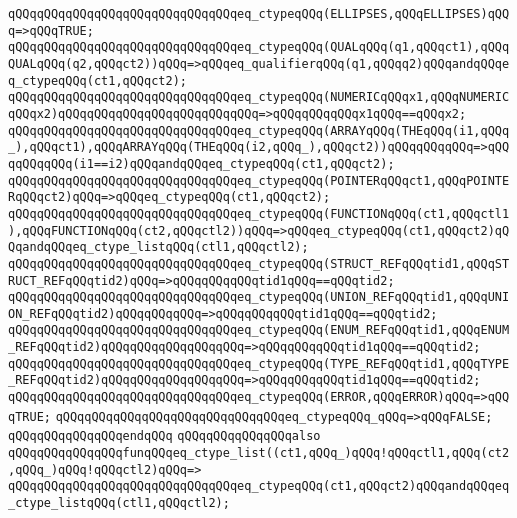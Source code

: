 \verb|qQQqqQQqqQQqqQQqqQQqqQQqqQQqqQQqeq_ctypeqQQq(ELLIPSES,qQQqELLIPSES)qQQq=>qQQqTRUE;|\newline
\verb|qQQqqQQqqQQqqQQqqQQqqQQqqQQqqQQqeq_ctypeqQQq(QUALqQQq(q1,qQQqct1),qQQqQUALqQQq(q2,qQQqct2))qQQq=>qQQqeq_qualifierqQQq(q1,qQQqq2)qQQqandqQQqeq_ctypeqQQq(ct1,qQQqct2);|\newline
\verb|qQQqqQQqqQQqqQQqqQQqqQQqqQQqqQQqeq_ctypeqQQq(NUMERICqQQqx1,qQQqNUMERICqQQqx2)qQQqqQQqqQQqqQQqqQQqqQQqqQQq=>qQQqqQQqqQQqx1qQQq==qQQqx2;|\newline
\verb|qQQqqQQqqQQqqQQqqQQqqQQqqQQqqQQqeq_ctypeqQQq(ARRAYqQQq(THEqQQq(i1,qQQq_),qQQqct1),qQQqARRAYqQQq(THEqQQq(i2,qQQq_),qQQqct2))qQQqqQQqqQQq=>qQQqqQQqqQQq(i1==i2)qQQqandqQQqeq_ctypeqQQq(ct1,qQQqct2);|\newline
\verb|qQQqqQQqqQQqqQQqqQQqqQQqqQQqqQQqeq_ctypeqQQq(POINTERqQQqct1,qQQqPOINTERqQQqct2)qQQq=>qQQqeq_ctypeqQQq(ct1,qQQqct2);|\newline
\verb|qQQqqQQqqQQqqQQqqQQqqQQqqQQqqQQqeq_ctypeqQQq(FUNCTIONqQQq(ct1,qQQqctl1),qQQqFUNCTIONqQQq(ct2,qQQqctl2))qQQq=>qQQqeq_ctypeqQQq(ct1,qQQqct2)qQQqandqQQqeq_ctype_listqQQq(ctl1,qQQqctl2);|\newline
\verb|qQQqqQQqqQQqqQQqqQQqqQQqqQQqqQQqeq_ctypeqQQq(STRUCT_REFqQQqtid1,qQQqSTRUCT_REFqQQqtid2)qQQq=>qQQqqQQqqQQqtid1qQQq==qQQqtid2;|\newline
\verb|qQQqqQQqqQQqqQQqqQQqqQQqqQQqqQQqeq_ctypeqQQq(UNION_REFqQQqtid1,qQQqUNION_REFqQQqtid2)qQQqqQQqqQQq=>qQQqqQQqqQQqtid1qQQq==qQQqtid2;|\newline
\verb|qQQqqQQqqQQqqQQqqQQqqQQqqQQqqQQqeq_ctypeqQQq(ENUM_REFqQQqtid1,qQQqENUM_REFqQQqtid2)qQQqqQQqqQQqqQQqqQQq=>qQQqqQQqqQQqtid1qQQq==qQQqtid2;|\newline
\verb|qQQqqQQqqQQqqQQqqQQqqQQqqQQqqQQqeq_ctypeqQQq(TYPE_REFqQQqtid1,qQQqTYPE_REFqQQqtid2)qQQqqQQqqQQqqQQqqQQq=>qQQqqQQqqQQqtid1qQQq==qQQqtid2;|\newline
\verb|qQQqqQQqqQQqqQQqqQQqqQQqqQQqqQQqeq_ctypeqQQq(ERROR,qQQqERROR)qQQq=>qQQqTRUE;|\newline
\verb|qQQqqQQqqQQqqQQqqQQqqQQqqQQqqQQqeq_ctypeqQQq_qQQq=>qQQqFALSE;|\newline
\verb|qQQqqQQqqQQqqQQqendqQQq|\newline
\newline
\verb|qQQqqQQqqQQqqQQqalso|\newline
\verb|qQQqqQQqqQQqqQQqfunqQQqeq_ctype_list((ct1,qQQq_)qQQq!qQQqctl1,qQQq(ct2,qQQq_)qQQq!qQQqctl2)qQQq=>|\newline
\verb|qQQqqQQqqQQqqQQqqQQqqQQqqQQqqQQqeq_ctypeqQQq(ct1,qQQqct2)qQQqandqQQqeq_ctype_listqQQq(ctl1,qQQqctl2);|\newline
